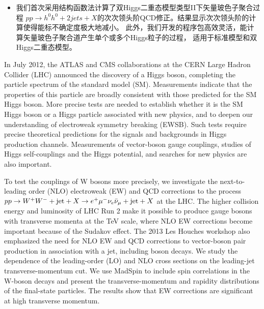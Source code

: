 \begin{cnabstract}
\begin{itemize}
\item 我们首次采用结构函数法计算了双Higgs二重态模型类型II下矢量玻色子聚合过程
$pp\to h^0h^0+2jets+X$的次次领头阶QCD修正。结果显示次次领头阶的计算使得能标不确定度极大地减小。
此外，我们开发的程序包高效灵活，能计算矢量玻色子聚合道产生单个或多个Higgs粒子的过程，
适用于标准模型和双Higgs二重态模型。
\end{itemize}

\end{cnabstract}


\begin{enabstract}
In July 2012, the ATLAS and CMS collaborations at the CERN Large Hadron Collider (LHC)
announced the discovery of a Higgs boson, completing the particle spectrum of the standard model (SM).
Measurements indicate that the properties of this particle are broadly consistent with those predicted
for the SM Higgs boson. More precise tests are needed to establish whether it is the SM Higgs boson
or a Higgs particle associated with new physics, and to deepen our understanding of electroweak
symmetry breaking (EWSB). Such tests require precise theoretical predictions for the signals and
backgrounds in Higgs production channels. Measurements of vector-boson gauge couplings, studies of
Higgs self-couplings and the Higgs potential, and searches for new physics are also important.

To test the couplings of W bosons more precisely, we investigate the next-to-leading order (NLO)
electroweak (EW) and QCD corrections to the process
$pp\to W^+W^-+{\rm jet}+X \to e^+ \mu^- \nu_e \bar \nu_{\mu}+{\rm jet}+X$ at the LHC.
The higher collision energy and luminosity of LHC Run 2 make it possible to produce gauge bosons
with transverse momenta at the TeV scale, where NLO EW corrections become important because of
the Sudakov effect. The 2013 Les Houches workshop also emphasized the need for NLO EW and QCD
corrections to vector-boson pair production in association with a jet, including boson decays.
We study the dependence of the leading-order (LO) and NLO cross sections on the leading-jet
transverse-momentum cut. We use MadSpin to include spin correlations in the W-boson decays and
present the transverse-momentum and rapidity distributions of the final-state particles.
The results show that EW corrections are significant at high transverse momentum.


\end{enabstract}
